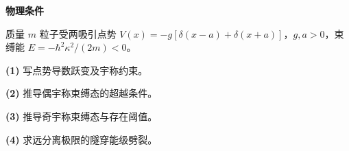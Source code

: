 \textbf{物理条件}\par 质量 \(m\) 粒子受两吸引点势 \(V(x)=-g[\delta(x-a)+\delta(x+a)]\)，\(g,a>0\)，束缚能 \(E=-\hbar^2\kappa^2/(2m)<0\)。
\par\noindent\textbf{(1)} 写点势导数跃变及宇称约束。
\par\noindent\textbf{(2)} 推导偶宇称束缚态的超越条件。
\par\noindent\textbf{(3)} 推导奇宇称束缚态与存在阈值。
\par\noindent\textbf{(4)} 求远分离极限的隧穿能级劈裂。

